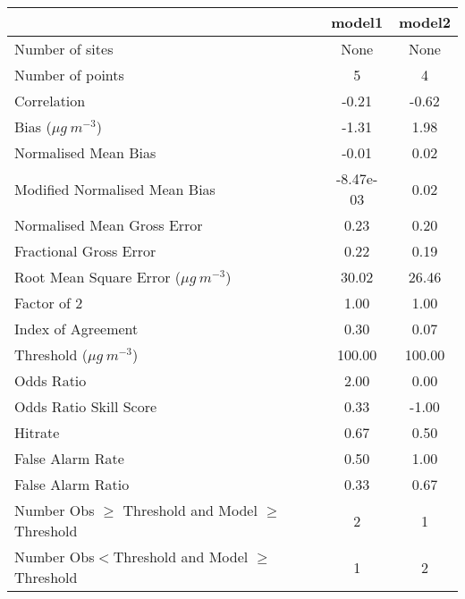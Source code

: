 \begin{table}
  \begin{center}
    \begin{tabular}{|l|c|c|} \hline
 & \textbf{model1}  & \textbf{model2} \\ \hline 
 Number of sites                               &      None &      None \\  \hline
 Number of points                              &         5 &         4 \\  \hline
 Correlation                                   &     -0.21 &     -0.62 \\  \hline
 Bias ($\mu g\ m^{-3}$)                        &     -1.31 &      1.98 \\  \hline
 Normalised Mean Bias                          &     -0.01 &      0.02 \\  \hline
 Modified Normalised Mean Bias                 & -8.47e-03 &      0.02 \\  \hline
 Normalised Mean Gross Error                   &      0.23 &      0.20 \\  \hline
 Fractional Gross Error                        &      0.22 &      0.19 \\  \hline
 Root Mean Square Error ($\mu g\ m^{-3}$)      &     30.02 &     26.46 \\  \hline
 Factor of 2                                   &      1.00 &      1.00 \\  \hline
 Index of Agreement                            &      0.30 &      0.07 \\  \hline
 Threshold ($\mu g\ m^{-3}$)                   &    100.00 &    100.00 \\  \hline
 Odds Ratio                                    &      2.00 &      0.00 \\  \hline
 Odds Ratio Skill Score                        &      0.33 &     -1.00 \\  \hline
 Hitrate                                       &      0.67 &      0.50 \\  \hline
 False Alarm Rate                              &      0.50 &      1.00 \\  \hline
 False Alarm Ratio                             &      0.33 &      0.67 \\  \hline
 Number Obs $\geq$ Threshold and Model $\geq$ Threshold &         2 &         1 \\  \hline
 Number Obs$<$Threshold and Model $\geq$ Threshold &         1 &         2 \\  \hline

\end{tabular}
\end{center}
\end{table}

